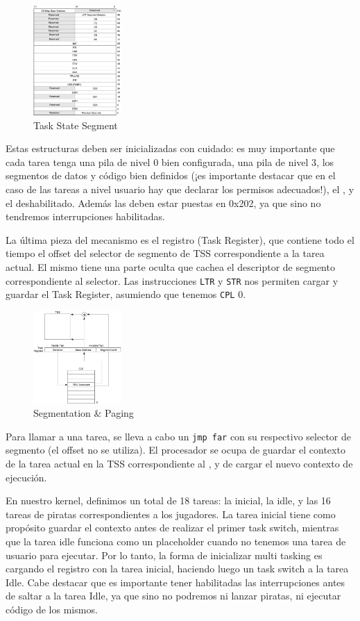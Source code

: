 \begin{figure}[H]
  \centering
    \includegraphics[width=0.3\textwidth]{images/tss}
  \caption{Task State Segment}
\end{figure}

Estas estructuras deben ser inicializadas con cuidado: es muy importante que cada tarea tenga una pila de nivel 0 bien configurada, una pila de nivel 3, los segmentos de datos y código bien definidos (¡es importante destacar que en el caso de las tareas a nivel usuario hay que declarar los permisos adecuados!), el , y el  deshabilitado. Además las  deben estar puestas en 0x202, ya que sino no tendremos interrupciones habilitadas.

La última pieza del mecanismo es el registro  (Task Register), que contiene todo el tiempo el offset del selector de segmento de TSS correspondiente a la tarea actual. El mismo tiene una parte oculta que cachea el descriptor de segmento correspondiente al selector. Las instrucciones \texttt{LTR} y \texttt{STR} nos permiten cargar y guardar el Task Register, asumiendo que tenemos \texttt{CPL} 0.

\begin{figure}[H]
  \centering
    \includegraphics[width=0.3\textwidth]{images/task_register}
  \caption{Segmentation \& Paging}
\end{figure}

Para llamar a una tarea, se lleva a cabo un \texttt{jmp far} con su respectivo selector de segmento (el offset no se utiliza). El procesador se ocupa de guardar el contexto de la tarea actual en la TSS correspondiente al , y de cargar el nuevo contexto de ejecución.

En nuestro kernel, definimos un total de 18 tareas: la inicial, la idle, y las 16 tareas de piratas correspondientes a los jugadores. La tarea inicial tiene como propósito guardar el contexto antes de realizar el primer task switch, mientras que la tarea idle funciona como un placeholder cuando no tenemos una tarea de usuario para ejecutar. Por lo tanto, la forma de inicializar multi tasking es cargando el registro  con la tarea inicial, haciendo luego un task switch a la tarea Idle. Cabe destacar que es importante tener habilitadas las interrupciones antes de saltar a la tarea Idle, ya que sino no podremos ni lanzar piratas, ni ejecutar código de los mismos.